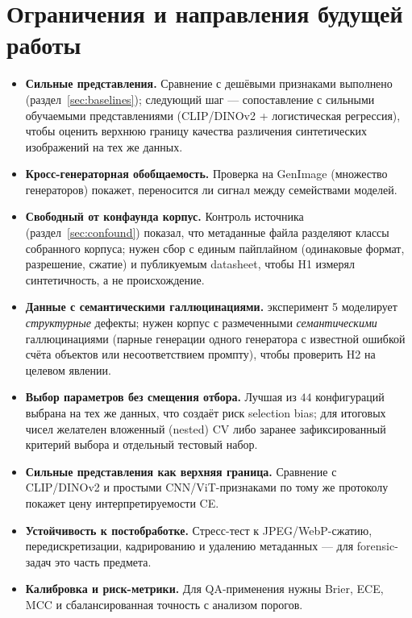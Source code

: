 \documentclass[14pt]{extarticle}
\theoremstyle{plain}
\numberwithin{equation}{section}
\numberwithin{figure}{section}
\numberwithin{table}{section}
\begin{document}
\section{Ограничения и направления будущей работы}\label{sec:future}
\begin{itemize}
\item \textbf{Сильные представления.} Сравнение с дешёвыми признаками выполнено
      (раздел~\ref{sec:baselines}); следующий шаг — сопоставление с сильными
      обучаемыми представлениями (CLIP/DINOv2 + логистическая регрессия), чтобы
      оценить верхнюю границу качества различения синтетических изображений на тех же данных.
\item \textbf{Кросс-генераторная обобщаемость.} Проверка на GenImage (множество
      генераторов) покажет, переносится ли сигнал между семействами моделей.
\item \textbf{Свободный от конфаунда корпус.} Контроль источника
      (раздел~\ref{sec:confound}) показал, что метаданные файла разделяют классы
      собранного корпуса; нужен сбор с единым пайплайном (одинаковые формат,
      разрешение, сжатие) и публикуемым datasheet, чтобы H1 измерял синтетичность,
      а не происхождение.
\item \textbf{Данные с семантическими галлюцинациями.} эксперимент 5 моделирует
      \emph{структурные} дефекты; нужен корпус с размеченными \emph{семантическими}
      галлюцинациями (парные генерации одного генератора с известной ошибкой счёта
      объектов или несоответствием промпту), чтобы проверить H2 на целевом явлении.
\item \textbf{Выбор параметров без смещения отбора.} Лучшая из $44$ конфигураций
      выбрана на тех же данных, что создаёт риск selection bias; для итоговых чисел
      желателен вложенный (nested) CV либо заранее зафиксированный критерий выбора и
      отдельный тестовый набор.
\item \textbf{Сильные представления как верхняя граница.} Сравнение с
      CLIP/DINOv2 и простыми CNN/ViT-признаками по тому же протоколу покажет цену
      интерпретируемости CE.
\item \textbf{Устойчивость к постобработке.} Стресс-тест к JPEG/WebP-сжатию,
      передискретизации, кадрированию и удалению метаданных — для forensic-задач это
      часть предмета.
\item \textbf{Калибровка и риск-метрики.} Для QA-применения нужны Brier, ECE, MCC и
      сбалансированная точность с анализом порогов.
\end{itemize}
\end{document}
